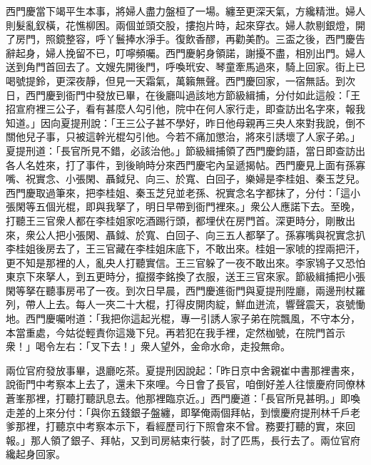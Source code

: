 西門慶當下竭平生本事，將婦人盡力盤桓了一場。纏至更深天氣，方纔精泄。婦人則髮亂釵橫，花憔柳困。兩個並頭交股，摟抱片時，起來穿衣。婦人款剔銀燈，開了房門，照鏡整容，呼丫鬟捧水淨手。復飲香醪，再勸美酌。三盃之後，西門慶告辭起身，婦人挽留不已，叮嚀頻囑。西門慶躬身領諾，謝擾不盡，相別出門。婦人送到角門首回去了。文嫂先開後門，呼喚玳安、琴童牽馬過來，騎上回家。街上已喝號提鈴，更深夜靜，但見一天霜氣，萬籟無聲。西門慶回家，一宿無話。到次日，西門慶到衙門中發放已畢，在後廳叫過該地方節級緝捕，分付如此這般：「王招宣府裡三公子，看有甚麼人勾引他，院中在何人家行走，即查訪出名字來，報我知道。」因向夏提刑說：「王三公子甚不學好，昨日他母親再三央人來對我說，倒不關他兒子事，只被這幹光棍勾引他。今若不痛加懲治，將來引誘壞了人家子弟。」夏提刑道：「長官所見不錯，必該治他。」節級緝捕領了西門慶鈞語，當日即查訪出各人名姓來，打了事件，到後晌時分來西門慶宅內呈遞揭帖。西門慶見上面有孫寡嘴、祝實念、小張閑、聶鉞兒、向三、於寬、白回子，樂婦是李桂姐、秦玉芝兒。西門慶取過筆來，把李桂姐、秦玉芝兒並老孫、祝實念名字都抹了，分付：「這小張閑等五個光棍，即與我拏了，明日早帶到衙門裡來。」衆公人應諾下去。至晚，打聽王三官衆人都在李桂姐家吃酒踢行頭，都埋伏在房門首。深更時分，剛散出來，衆公人把小張閑、聶鉞、於寬、白回子、向三五人都拏了。孫寡嘴與祝實念扒李桂姐後房去了，王三官藏在李桂姐床底下，不敢出來。桂姐一家唬的捏兩把汗，更不知是那裡的人，亂央人打聽實信。王三官躲了一夜不敢出來。李家鴇子又恐怕東京下來拏人，到五更時分，攛掇李銘換了衣服，送王三官來家。節級緝捕把小張閑等拏在聽事房弔了一夜。到次日早晨，西門慶進衙門與夏提刑陞廳，兩邊刑杖羅列，帶人上去。每人一夾二十大棍，打得皮開肉綻，鮮血迸流，響聲震天，哀號慟地。西門慶囑咐道：「我把你這起光棍，專一引誘人家子弟在院飄風，不守本分，本當重處，今姑從輕責你這幾下兒。再若犯在我手裡，定然枷號，在院門首示衆！」喝令左右：「叉下去！」衆人望外，金命水命，走投無命。

兩位官府發放事畢，退廳吃茶。夏提刑因說起：「昨日京中舍親崔中書那裡書來，說衙門中考察本上去了，還未下來哩。今日會了長官，咱倒好差人往懷慶府同僚林蒼峯那裡，打聽打聽訊息去。他那裡臨京近。」西門慶道：「長官所見甚明。」即喚走差的上來分付：「與你五錢銀子盤纏，即拏俺兩個拜帖，到懷慶府提刑林千戶老爹那裡，打聽京中考察本示下，看經歷司行下照會來不曾。務要打聽的實，來回報。」那人領了銀子、拜帖，又到司房結束行裝，討了匹馬，長行去了。兩位官府纔起身回家。

